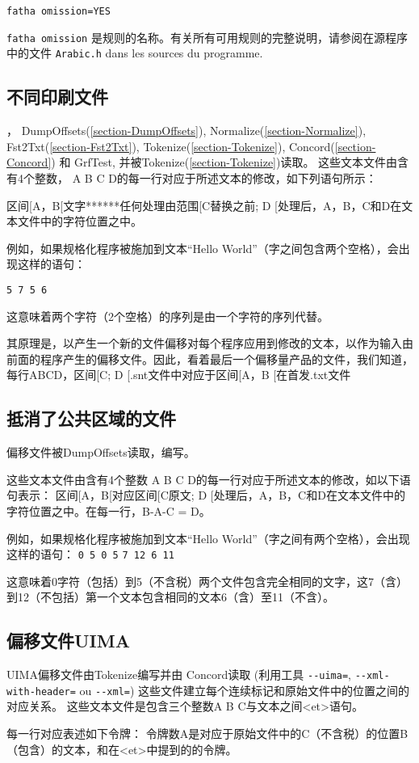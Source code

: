 \bigskip
\noindent \verb+fatha omission=YES+

\bigskip
\noindent  \verb+fatha omission+ 是规则的名称。有关所有可用规则的完整说明，请参阅在源程序中的文件 \verb+Arabic.h+ dans les sources du programme.

\subsection{不同印刷文件}
\label{subsection-offsets-diff}，
 DumpOffsets(\ref{section-DumpOffsets}), Normalize(\ref{section-Normalize}), Fst2Txt(\ref{section-Fst2Txt}), Tokenize(\ref{section-Tokenize}), Concord(\ref{section-Concord}) 和 GrfTest, 并被Tokenize(\ref{section-Tokenize})读取。
\bigskip
这些文本文件由含有4个整数， A B C D的每一行对应于所述文本的修改，如下列语句所示：

\bigskip
区间[A，B[文字******任何处理由范围[C替换之前; D [处理后，A，B，C和D在文本文件中的字符位置之中。
\bigskip

例如，如果规格化程序被施加到文本“Hello World”（字之间包含两个空格），会出现这样的语句：

\bigskip
\noindent \verb+5 7 5 6+
\bigskip

这意味着两个字符（2个空格）的序列是由一个字符的序列代替。

\bigskip

其原理是，以产生一个新的文件偏移对每个程序应用到修改的文本，以作为输入由前面的程序产生的偏移文件。因此，看着最后一个偏移量产品的文件，我们知道，每行ABCD，区间[C; D [.snt文件中对应于区间[A，B [在首发.txt文件

\subsection{抵消了公共区域的文件}
\label{subsection-offsets-common}
偏移文件被DumpOffsets读取，编写。

\bigskip
这些文本文件由含有4个整数 A B C D的每一行对应于所述文本的修改，如以下语句表示：
\bigskip
区间[A，B[对应区间[C原文; D [处理后，A，B，C和D在文本文件中的字符位置之中。在每一行，B-A-C = D。
\bigskip

例如，如果规格化程序被施加到文本“Hello World”（字之间有两个空格），会出现这样的语句：
\bigskip
\noindent \verb+0 5 0 5+
\newline
\noindent \verb+7 12 6 11+
\bigskip

这意味着0字符（包括）到5（不含税）两个文件包含完全相同的文字，这7（含）到12（不包括）第一个文本包含相同的文本6（含）至11（不含）。


\subsection{偏移文件UIMA}
\label{subsection-offsets-uima}
UIMA偏移文件由Tokenize编写并由 Concord读取 (利用工具 \verb$--uima=$, \verb$--xml-with-header=$ ou \verb$--xml=$) 这些文件建立每个连续标记和原始文件中的位置之间的对应关系。
\bigskip
这些文本文件是包含三个整数A B C与文本之间<et>语句。

\bigskip
每一行对应表述如下令牌：
令牌数A是对应于原始文件中的C（不含税）的位置B（包含）的文本，和在<et>中提到的的令牌。


\bigskip
